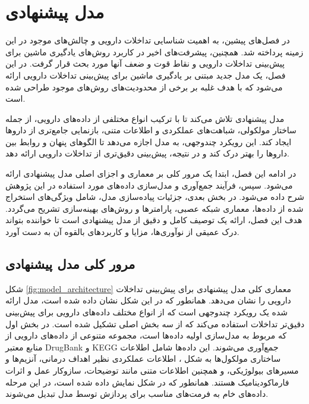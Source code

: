 \chapter{مدل پیشنهادی}

در فصل‌های پیشین، به اهمیت شناسایی تداخلات دارویی و چالش‌های موجود در این زمینه پرداخته شد. همچنین، پیشرفت‌های اخیر در کاربرد روش‌های یادگیری ماشین برای پیش‌بینی تداخلات دارویی و نقاط قوت و ضعف آنها مورد بحث قرار گرفت. در این فصل، یک مدل جدید مبتنی بر یادگیری ماشین برای پیش‌بینی تداخلات دارویی ارائه می‌شود که با هدف غلبه بر برخی از محدودیت‌های روش‌های موجود طراحی شده است.

مدل پیشنهادی تلاش می‌کند تا با ترکیب انواع مختلفی از داده‌های دارویی، از جمله ساختار مولکولی، شباهت‌های عملکردی و اطلاعات متنی، بازنمایی جامع‌تری از داروها ایجاد کند. این رویکرد چندوجهی، به مدل اجازه می‌دهد تا الگوهای پنهان و روابط بین داروها را بهتر درک کند و در نتیجه، پیش‌بینی دقیق‌تری از تداخلات دارویی ارائه دهد.

در ادامه این فصل، ابتدا یک مرور کلی بر معماری و اجزای اصلی مدل پیشنهادی ارائه می‌شود. سپس، فرآیند جمع‌آوری و مدل‌سازی داده‌های مورد استفاده در این پژوهش شرح داده می‌شود. در بخش بعدی، جزئیات پیاده‌سازی مدل، شامل ویژگی‌های استخراج شده از داده‌ها، معماری شبکه عصبی، پارامترها و روش‌های بهینه‌سازی تشریح می‌گردد. هدف این فصل، ارائه یک توصیف کامل و دقیق از مدل پیشنهادی است تا خواننده بتواند درک عمیقی از نوآوری‌ها، مزایا و کاربردهای بالقوه آن به دست آورد.

\section{مرور کلی مدل پیشنهادی}

شکل \ref{fig:model_architecture} معماری کلی مدل پیشنهادی برای پیش‌بینی تداخلات دارویی را نشان می‌دهد. همانطور که در این شکل نشان داده شده است، مدل ارائه شده یک رویکرد چندوجهی است که از انواع مختلف داده‌های دارویی برای پیش‌بینی دقیق‌تر تداخلات استفاده می‌کند که از سه بخش اصلی تشکیل شده است. در بخش اول که مربوط به مدل‌سازی اولیه داده‌ها است، مجموعه متنوعی از داده‌های دارویی از منابع معتبر DrugBank و KEGG جمع‌آوری می‌شوند. این داده‌ها شامل اطلاعات ساختاری مولکول‌ها به شکل ، اطلاعات عملکردی نظیر اهداف درمانی، آنزیم‌ها و مسیرهای بیولوژیکی، و همچنین اطلاعات متنی مانند توضیحات، سازوکار عمل و اثرات فارماکودینامیک هستند. همانطور که در شکل نمایش داده شده است، در این مرحله داده‌های خام به فرمت‌های مناسب برای پردازش توسط مدل تبدیل می‌شوند.

